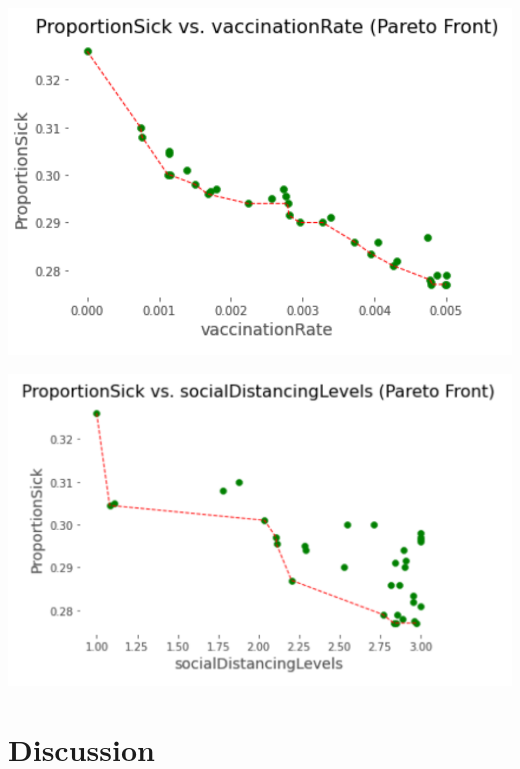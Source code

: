 {%


\includegraphics[width=0.49\linewidth]{../figures/pareto.png}

\includegraphics[width=0.49\linewidth]{../figures/pareto2.png}



}

\section{Discussion}


